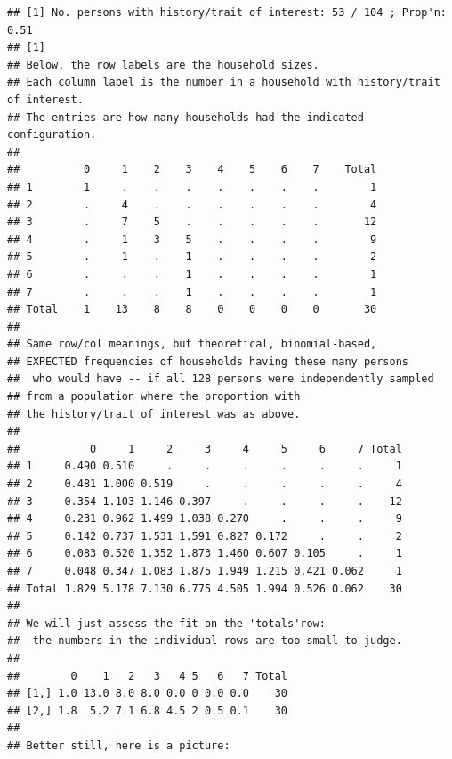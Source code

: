 \documentclass[]{book}
\begin{document}
\begin{verbatim}
## [1] No. persons with history/trait of interest: 53 / 104 ; Prop'n: 0.51
## [1]  
## Below, the row labels are the household sizes.
## Each column label is the number in a household with history/trait of interest.
## The entries are how many households had the indicated configuration.
## 
##          0     1    2    3    4    5    6    7    Total
## 1        1     .    .    .    .    .    .    .        1
## 2        .     4    .    .    .    .    .    .        4
## 3        .     7    5    .    .    .    .    .       12
## 4        .     1    3    5    .    .    .    .        9
## 5        .     1    .    1    .    .    .    .        2
## 6        .     .    .    1    .    .    .    .        1
## 7        .     .    .    1    .    .    .    .        1
## Total    1    13    8    8    0    0    0    0       30
## 
## Same row/col meanings, but theoretical, binomial-based,
## EXPECTED frequencies of households having these many persons
##  who would have -- if all 128 persons were independently sampled
## from a population where the proportion with 
## the history/trait of interest was as above.
## 
##           0     1     2     3     4     5     6     7 Total
## 1     0.490 0.510     .     .     .     .     .     .     1
## 2     0.481 1.000 0.519     .     .     .     .     .     4
## 3     0.354 1.103 1.146 0.397     .     .     .     .    12
## 4     0.231 0.962 1.499 1.038 0.270     .     .     .     9
## 5     0.142 0.737 1.531 1.591 0.827 0.172     .     .     2
## 6     0.083 0.520 1.352 1.873 1.460 0.607 0.105     .     1
## 7     0.048 0.347 1.083 1.875 1.949 1.215 0.421 0.062     1
## Total 1.829 5.178 7.130 6.775 4.505 1.994 0.526 0.062    30
## 
## We will just assess the fit on the 'totals'row:
##  the numbers in the individual rows are too small to judge.
## 
##        0    1   2   3   4 5   6   7 Total
## [1,] 1.0 13.0 8.0 8.0 0.0 0 0.0 0.0    30
## [2,] 1.8  5.2 7.1 6.8 4.5 2 0.5 0.1    30
## 
## Better still, here is a picture:
\end{verbatim}
\end{document}
